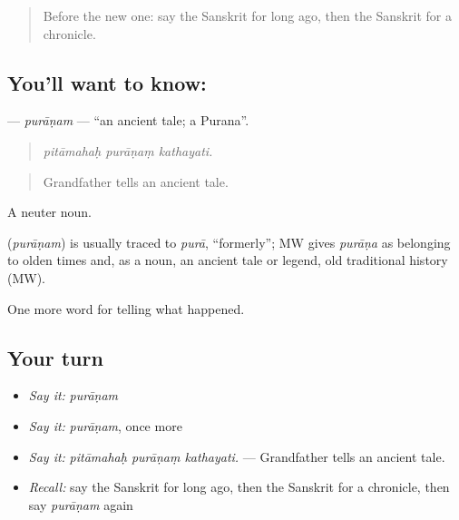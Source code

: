 \label{lesson:SA-C324-puranam}



\begin{quote}
Before the new one: say the Sanskrit for long ago, then the Sanskrit for a chronicle.
\end{quote}

\subsection*{You'll want to know: }
\textbf{} — \emph{purāṇam} — \textquotedblleft{}an ancient tale; a Purana\textquotedblright{}.

\begin{quote}
  
\end{quote}

\begin{quote}
\emph{pitāmahaḥ purāṇaṃ kathayati.}
\end{quote}

\begin{quote}
Grandfather tells an ancient tale.
\end{quote}

A neuter noun.

\begin{cousinweb}
\textbf{} (\emph{purāṇam}) is usually traced to \emph{purā}, \textquotedblleft{}formerly\textquotedblright{}; MW gives \emph{purāṇa} as belonging to olden times and, as a noun, an ancient tale or legend, old traditional history (MW).
\end{cousinweb}

\begin{grammarlens}[title={What you've built}]
One more word for telling what happened.
\end{grammarlens}

\subsection*{Your turn}
\begin{itemize}
\raggedright
  \item \emph{Say it:} \emph{purāṇam}
  \item \emph{Say it:} \emph{purāṇam}, once more
  \item \emph{Say it:} \emph{pitāmahaḥ purāṇaṃ kathayati.} — Grandfather tells an ancient tale.
  \item \emph{Recall:} say the Sanskrit for long ago, then the Sanskrit for a chronicle, then say \emph{purāṇam} again
\end{itemize}

